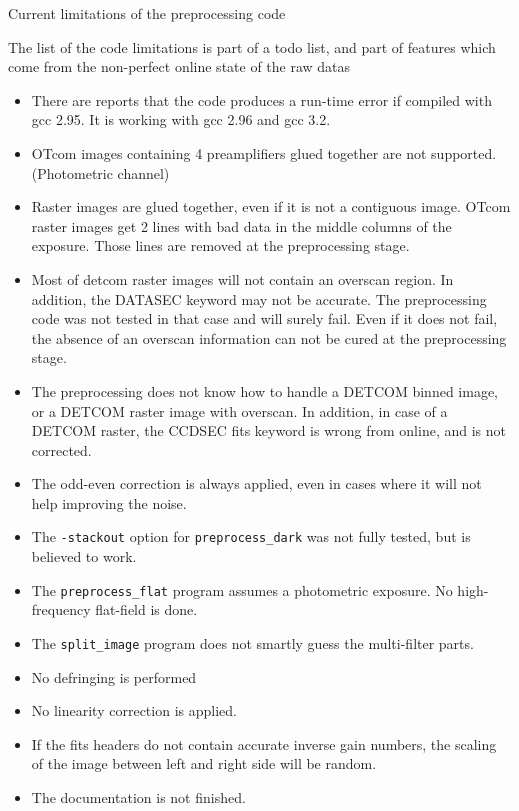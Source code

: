 \begin{subsection}{Current limitations of the preprocessing code}

The list of the code limitations is part of a todo list, and part of
features which come from the non-perfect online state of the raw
datas

\begin{itemize}
\item There are reports that the code produces a run-time error if
compiled with gcc 2.95. It is working with gcc 2.96 and gcc 3.2.
\item OTcom images containing 4 preamplifiers glued together are not
supported. (Photometric channel)
\item Raster images are glued together, even if it is not a contiguous
image. 
OTcom raster images get 2 lines with bad data in the middle
columns of the exposure. Those lines are removed at the preprocessing
stage.
\item Most of detcom raster images will not contain an overscan
region. In addition, the DATASEC keyword may not be accurate. 
The preprocessing code was not tested in that case and will surely
fail. Even if it does not fail, the absence of an overscan information
can not be cured at the preprocessing stage.
\item The preprocessing does not know how to handle a DETCOM binned image,
or a DETCOM raster image with overscan. In addition, in case of a DETCOM
raster, the CCDSEC fits keyword is wrong from online, and is not
corrected.
\item The odd-even correction is always applied, even in cases where
it will not help improving the noise.
\item The {\tt -stackout} option for {\tt preprocess\_dark} was not
fully tested, but is believed to work.
\item The {\tt preprocess\_flat} program assumes a photometric
exposure. No high-frequency flat-field is done.
\item The {\tt split\_image} program does not smartly guess the
multi-filter parts.
\item No defringing is performed
\item No linearity correction is applied.
\item If the fits headers do not contain accurate inverse gain
numbers, the scaling of the image between left and right side will be
random.
\item The documentation is not finished.
\end{itemize}

\end{subsection}

